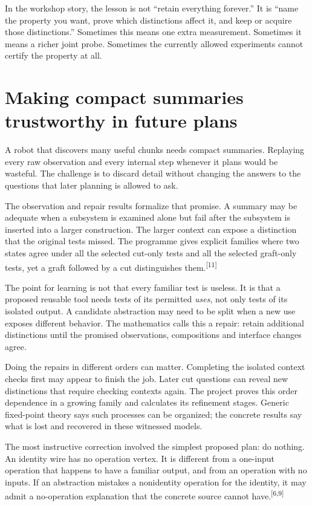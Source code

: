\documentclass[11pt]{article}
\newcommand{\sn}[1]{\textsuperscript{[#1]}}
\begin{document}
In the workshop story, the lesson is not ``retain everything forever.'' It is ``name the property you want, prove which distinctions affect it, and keep or acquire those distinctions.'' Sometimes this means one extra measurement. Sometimes it means a richer joint probe. Sometimes the currently allowed experiments cannot certify the property at all.

\section{Making compact summaries trustworthy in future plans}

A robot that discovers many useful chunks needs compact summaries. Replaying every raw observation and every internal step whenever it plans would be wasteful. The challenge is to discard detail without changing the answers to the questions that later planning is allowed to ask.

The observation and repair results formalize that promise. A summary may be adequate when a subsystem is examined alone but fail after the subsystem is inserted into a larger construction. The larger context can expose a distinction that the original tests missed. The programme gives explicit families where two states agree under all the selected cut-only tests and all the selected graft-only tests, yet a graft followed by a cut distinguishes them.\sn{11}

The point for learning is not that every familiar test is useless. It is that a proposed reusable tool needs tests of its permitted \emph{uses}, not only tests of its isolated output. A candidate abstraction may need to be split when a new use exposes different behavior. The mathematics calls this a repair: retain additional distinctions until the promised observations, compositions and interface changes agree.

Doing the repairs in different orders can matter. Completing the isolated context checks first may appear to finish the job. Later cut questions can reveal new distinctions that require checking contexts again. The project proves this order dependence in a growing family and calculates its refinement stages. Generic fixed-point theory says such processes can be organized; the concrete results say what is lost and recovered in these witnessed models.

The most instructive correction involved the simplest proposed plan: do nothing. An identity wire has no operation vertex. It is different from a one-input operation that happens to have a familiar output, and from an operation with no inputs. If an abstraction mistakes a nonidentity operation for the identity, it may admit a no-operation explanation that the concrete source cannot have.\sn{6,9}
\end{document}
